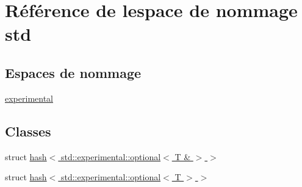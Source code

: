 \hypertarget{namespacestd}{}\section{Référence de l\textquotesingle{}espace de nommage std}
\label{namespacestd}
\subsection*{Espaces de nommage}
\begin{DoxyCompactItemize}
\item 
 \hyperlink{namespacestd_1_1experimental}{experimental}
\end{DoxyCompactItemize}
\subsection*{Classes}
\begin{DoxyCompactItemize}
\item 
struct \hyperlink{structstd_1_1hash_3_01std_1_1experimental_1_1optional_3_01_t_01_6_01_4_01_4}{hash$<$ std\+::experimental\+::optional$<$ T \& $>$ $>$}
\item 
struct \hyperlink{structstd_1_1hash_3_01std_1_1experimental_1_1optional_3_01_t_01_4_01_4}{hash$<$ std\+::experimental\+::optional$<$ T $>$ $>$}
\end{DoxyCompactItemize}
